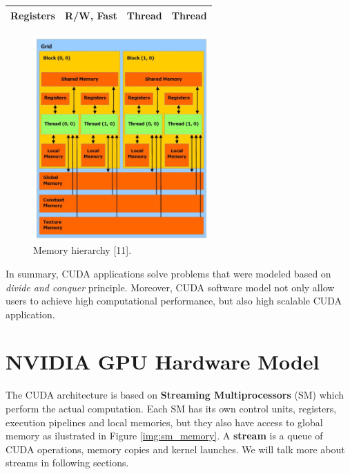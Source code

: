 \documentclass[
  12pt,
  a4paperpaper,
]{report}
\begin{document}
\begin{longtable}[]{@{}llll@{}}
\begin{minipage}[t]{0.13\columnwidth}\raggedright
Registers\strut
\end{minipage} & \begin{minipage}[t]{0.53\columnwidth}\raggedright
R/W, Fast\strut
\end{minipage} & \begin{minipage}[t]{0.09\columnwidth}\raggedright
Thread\strut
\end{minipage} & \begin{minipage}[t]{0.13\columnwidth}\raggedright
Thread\strut
\end{minipage}\tabularnewline
\bottomrule
\end{longtable}

\begin{figure}
\centering
\includegraphics[width=0.6\textwidth,height=\textheight]{source/figures/sw_model_memory.png}
\caption{Memory hierarchy {[}11{]}. \label{img:sw_model_memory}}
\end{figure}

In summary, CUDA applications solve problems that were modeled based on
\emph{divide and conquer} principle. Moreover, CUDA software model not
only allow users to achieve high computational performance, but also
high scalable CUDA application.

\hypertarget{nvidia-gpu-hardware-model}{%
\section{NVIDIA GPU Hardware Model}\label{nvidia-gpu-hardware-model}}

The CUDA architecture is based on \textbf{Streaming Multiprocessors}
(SM) which perform the actual computation. Each SM has its own control
units, registers, execution pipelines and local memories, but they also
have access to global memory as ilustrated in Figure
\ref{img:sm_memory}. A \textbf{stream} is a queue of CUDA operations,
memory copies and kernel launches. We will talk more about streams in
following sections.
\end{document}

